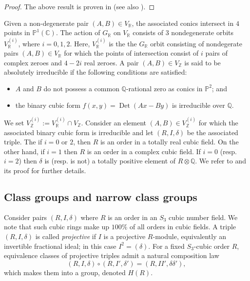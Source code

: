 \documentclass[table]{amsart}
\newcommand{\Z}{\mathbb{Z}}
\newcommand{\Q}{\mathbb{Q}}
\numberwithin{equation}{section}
\begin{document}
\begin{proof}
The above result is proven in \cite{bhargavahighercomplaws2} (see also \cite[Theorem~11]{BhargavaVarma}).
\end{proof}
\par Given a non-degenerate pair $(A,B)\in V_{\mathbb{R}}$, the associated conics intersect in $4$ points in $\mathbb{P}^1(\mathbb{C})$. The action of $G_{\mathbb{R}}$ on $V_{\mathbb{R}}$ consists of $3$ nondegenerate orbits $V_{\mathbb{R}}^{(i)}$, where $i=0,1,2$. Here, $V_{\mathbb{R}}^{(i)}$ is the the $G_{\mathbb{R}}$ orbit consisting of nondegerate pairs $(A,B)\in V_{\mathbb{R}}$ for which the points of intersection consist of $i$ pairs of complex zeroes and $4-2i$ real zeroes. A pair $(A,B)\in V_{\Z}$ is said to be absolutely irreducible if the following conditions are satisfied:
\begin{itemize}
    \item $A$ and $B$ do not possess a common $\mathbb{Q}$-rational zero as conics in $\mathbb{P}^{2}$; and
    \item the binary cubic form $f(x, y)=\operatorname{Det}(A x-B y)$ is irreducible over $\mathbb{Q}$.
\end{itemize}
We set $V_\Z^{(i)}:=V_{\mathbb{R}}^{(i)}\cap V_{\Z}$. Consider an element $(A,B)\in V_\Z^{(i)}$ for which the associated binary cubic form is irreducible and let $(R, I, \delta)$ be the associated triple. The if $i=0$ or $2$, then $R$ is an order in a totally real cubic field. On the other hand, if $i=1$ then $R$ is an order in a complex cubic field. If $i=0$ (resp. $i=2$) then $\delta$ is (resp. is not) a totally positive element of $R\otimes \Q$. We refer to \cite[Lemma 21]{BhargavaVarma} and its proof for further details.
\subsection{Class groups and narrow class groups}
\par Consider pairs $(R, I, \delta)$ where $R$ is an order in an $S_3$ cubic number field. We note that such cubic rings make up $100\%$ of all orders in cubic fields. A triple $(R,I,\delta)$ is called \emph{projective} if $I$ is a projective
$R$-module, equivalently an invertible fractional ideal; in this case
$I^{2}=(\delta)$. For a fixed $S_{3}$-cubic order $R$, equivalence classes of
projective triples admit a natural composition law
\[
(R,I,\delta)\circ (R,I',\delta')=(R,II',\delta\delta'),
\]
which makes them into a group, denoted $H(R)$.
\end{document}

